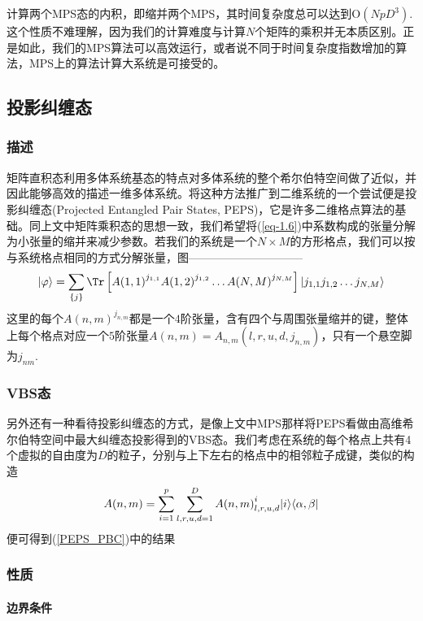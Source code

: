 计算两个MPS态的内积，即缩并两个MPS，其时间复杂度总可以达到$\mathrm{O}(NpD^3)$. 这个性质不难理解，因为我们的计算难度与计算$N$个矩阵的乘积并无本质区别。正是如此，我们的MPS算法可以高效运行，或者说不同于时间复杂度指数增加的算法，MPS上的算法计算大系统是可接受的。

\subsection{投影纠缠态}
\subsubsection{描述}

矩阵直积态利用多体系统基态的特点对多体系统的整个希尔伯特空间做了近似，并因此能够高效的描述一维多体系统。将这种方法推广到二维系统的一个尝试便是投影纠缠态(Projected Entangled Pair States, PEPS)，它是许多二维格点算法的基础。同上文中矩阵乘积态的思想一致，我们希望将(\ref{eq-1.6})中系数构成的张量分解为小张量的缩并来减少参数。若我们的系统是一个$N\times M$的方形格点，我们可以按与系统格点相同的方式分解张量，图——————————
\begin{equation}\label{PEPS_PBC}
\ket{\varphi} = \sum_{\{j\}} \Tr\left[ A{(1,1)}^{j_{1,1}} A{(1,2)}^{j_{1,2}}\dots A{(N,M)}^{j_{N,M}} \right]\ket{j_{1,1} j_{1,2}\dots j_{N,M}}
\end{equation}
这里的每个$A{(n,m)}^{j_{n,m}}$都是一个$4$阶张量，含有四个与周围张量缩并的键，整体上每个格点对应一个$5$阶张量$A{(n,m)} = A_{n,m}(l,r,u,d,j_{n,m})$，只有一个悬空脚为$j_{nm}$.

\subsubsection{VBS态}

另外还有一种看待投影纠缠态的方式，是像上文中MPS那样将PEPS看做由高维希尔伯特空间中最大纠缠态投影得到的VBS态。我们考虑在系统的每个格点上共有4个虚拟的自由度为$D$的粒子，分别与上下左右的格点中的相邻粒子成键，类似的构造
\begin{equation}
A(n,m) = \sum_{i=1}^p\sum_{l,r,u,d=1}^D {A(n,m)}^i_{l,r,u,d}\lvert i\rangle\langle\alpha,\beta\rvert
\end{equation}
便可得到(\ref{PEPS_PBC})中的结果

\subsubsection{性质}

\paragraph{边界条件}

